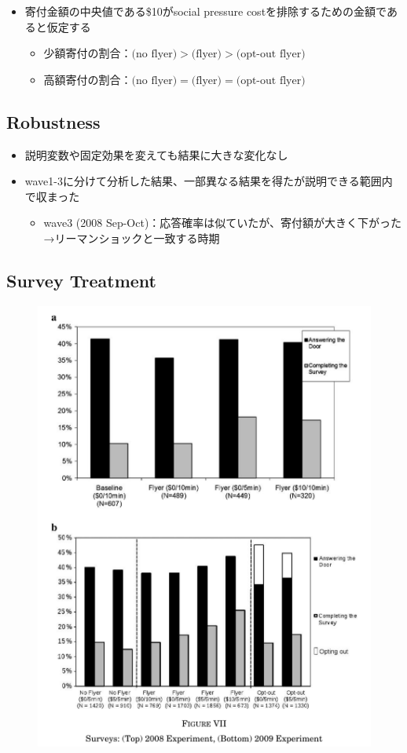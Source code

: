 \documentclass[../root]{subfiles}
\begin{document}
    \begin{itemize}
        \item 寄付金額の中央値である\$10がsocial pressure costを排除するための金額であると仮定する
        \begin{itemize}
            \item 少額寄付の割合：$\text{(no flyer)} > \text{(flyer)} > \text{(opt-out flyer)}$
            \item 高額寄付の割合：$\text{(no flyer)} = \text{(flyer)} = \text{(opt-out flyer)}$
        \end{itemize}
    \end{itemize}

    \subsection{Robustness}

    \begin{itemize}
        \item 説明変数や固定効果を変えても結果に大きな変化なし
        \item wave1-3に分けて分析した結果、一部異なる結果を得たが説明できる範囲内で収まった
        \begin{itemize}
            \item wave3 (2008 Sep-Oct)：応答確率は似ていたが、寄付額が大きく下がった→リーマンショックと一致する時期
        \end{itemize}
    \end{itemize}

    \subsection{Survey Treatment}

    \begin{figure}[h]
        \centering
        \includegraphics[width = .5\linewidth]{0821kato/fig9_2.png}
        \label{}
    \end{figure}
\end{document}
